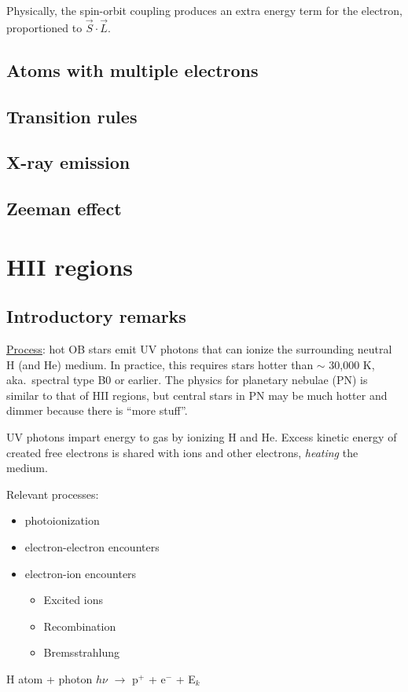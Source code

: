 \documentclass[11pt]{article}
\newcommand{\mar}[1]{\hspace{0pt}\marginpar{-\textcolor{black}{#1}-}}
\let\oldsection\section
\renewcommand\section{\clearpage\oldsection}
\begin{document}
Physically, the spin-orbit coupling produces an extra energy term for the
electron, proportioned to $\vec{S}\cdot\vec{L}$.

\mar{I10}
\subsection{Atoms with multiple electrons}

\mar{I11}
\mar{I12}
\mar{I13}
\mar{I14}
\mar{I15}
\mar{I16}
\mar{I17}
\mar{I18}
\mar{I19}
\subsection{Transition rules}

\mar{I20}
\subsection{X-ray emission}
\subsection{Zeeman effect}

\mar{I21}

\newpage
\mar{51}
\section{HII regions}
\subsection{Introductory remarks}
\underline{Process}: hot OB stars emit UV photons that can ionize the
surrounding neutral H (and He) medium. In practice, this requires stars hotter
than $\sim$ 30,000 K, aka.\ spectral type B0 or earlier.
The physics for planetary nebulae (PN) is similar to that of HII regions,
but central stars in PN may be much hotter and dimmer
because there is ``more stuff''.

UV photons impart energy to gas by ionizing H and He. Excess kinetic energy
of created free electrons is shared with ions and other electrons,
\emph{heating} the medium.

Relevant processes:
\begin{itemize}
    \item photoionization
    \item electron-electron encounters
    \item electron-ion encounters
        \begin{itemize}
            \item Excited ions
            \item Recombination
            \item Bremsstrahlung
        \end{itemize}
\end{itemize}
H atom + photon $h\nu$ $\longrightarrow$ p$^{+}$ + e$^{-}$ + E$_{k}$
\end{document}
